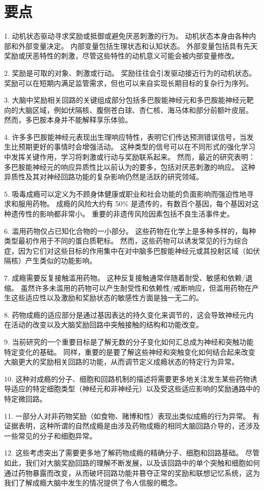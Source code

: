 \section{要点}

1. 动机状态驱动寻求奖励或抵御或避免厌恶刺激的行为。
动机状态本身由各种内部和外部变量决定。
内部变量包括生理状态和认知状态。
外部变量包括具有先天奖励或厌恶特性的刺激，尽管这些特性的动机意义可能会被内部变量修改。


2. 奖励是可取的对象、刺激或行动。
奖励往往会引发驱动接近行为的动机状态。
奖励可以在短期内满足监管需求，但也可以来自实现长期目标的复杂行为序列。


3. 大脑中奖励相关回路的关键组成部分包括多巴胺能神经元和多巴胺能神经元靶向的大脑区域，例如伏隔核、腹侧苍白球、杏仁核、海马体和部分前额叶皮层。
然而，多巴胺本身并不能解释享乐体验。 


4. 许多多巴胺能神经元表现出生理响应特性，表明它们传达预测错误信号，当发生比预期更好的事情时会增强活动。
这种类型的信号可以在不同形式的强化学习中发挥关键作用，学习将刺激或行动与奖励联系起来。
然而，最近的研究表明：多巴胺能神经元的响应异质性比以前认为的要多，包括对厌恶刺激的响应。
这种异质性及其对神经回路功能的复杂影响仍然是活跃的研究领域。


5. 吸毒成瘾可以定义为不顾身体健康或职业和社会功能的负面影响而强迫性地寻求和服用药物。
成瘾的风险大约有 50\% 是遗传的，有数百个基因，每个基因对这种遗传性的影响都非常小。
重要的非遗传风险因素包括不良生活事件史。


6. 滥用药物仅占已知化合物的一小部分。
这些药物在化学上是多种多样的，每种类型最初作用于不同的蛋白质靶标。
然而，这些药物可以诱发常见的行为综合症，因为它们对这些目标的作用集中在对中脑多巴胺能神经元或其投射区域（如伏隔核）产生类似的功能影响。


7. 成瘾需要反复接触滥用药物。
这种反复接触通常伴随着耐受、敏感和依赖/退缩。
虽然许多未滥用的药物可以产生耐受性和依赖性/戒断响应，但滥用药物在产生这些适应性以及激励和奖励状态的敏感性方面是独一无二的。


8. 药物成瘾的适应部分是通过基因表达的持久变化来调节的，这会导致神经元内在活动的改变以及大脑奖励回路中突触接触的结构和功能改变。


9. 当前研究的一个重要目标是了解无数的分子变化如何汇总成为神经和突触功能特定变化的基础。
同样，重要的是要了解这些神经和突触变化如何结合起来改变大脑更大的奖励相关回路的功能，从而调节定义成瘾状态的特定行为异常。


10. 这种对成瘾的分子、细胞和回路机制的描述将需要更多地关注发生某些药物诱导适应的特定细胞类型（神经元和非神经元）以及受这些适应影响的奖励通路中的特定微回路。


11. 一部分人对非药物奖励（如食物、赌博和性）表现出类似成瘾的行为异常。
有证据表明，这种所谓的自然成瘾是由涉及药物成瘾的相同大脑回路介导的，还涉及一些常见的分子和细胞异常。 


12. 这些考虑突出了需要更多地了解药物成瘾的精确分子、细胞和回路基础。
尽管如此，我们对大脑奖励回路的理解不断发展，以及该回路中的单个突触和细胞如何通过药物暴露而改变，从而破坏回路功能并篡夺正常的奖励和联想记忆系统，这为我们了解成瘾大脑中发生的情况提供了令人信服的概念。


